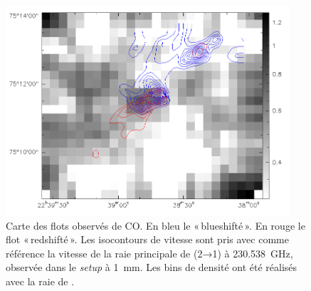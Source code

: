 \documentclass[a4paper,10pt,french]{article}
\newcommand{\setup}{\textit{setup}}
\newcommand{\unmm}{\SI{1}{\milli\meter}}
\begin{document}
\begin{figure}[!ht]
    \centering
    \includegraphics[width=0.94\textwidth]{mapC17O.png}
    \caption{
        Carte des flots observés de CO. En bleu le  « blueshifté ».
        En rouge le flot « redshifté ». Les isocontours de vitesse sont pris
        avec comme référence la vitesse de la raie principale de 
        (2→1) à \SI{230.538}{\giga\hertz}, observée dans le \setup{} à \unmm.
        Les bins de densité ont été réalisés avec la raie de .
    }
    \label{fig:mapC17O}
\end{figure}
\end{document}
